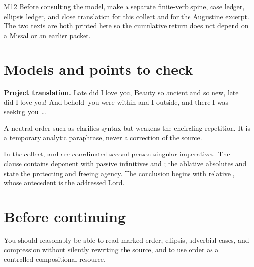 \begin{courseunit}{M12}
Before consulting the model, make a separate finite-verb spine, case ledger,
ellipsis ledger, and close translation for this collect and for the Augustine
excerpt.  The two texts are both printed here so the cumulative return does not
depend on a Missal or an earlier packet.

\ifsolutions
\section{Models and points to check}
\textbf{Project translation.} Late did I love you, Beauty so ancient and so
new, late did I love you! And behold, you were within and I outside, and there
I was seeking you~\ldots

A neutral order such as 
clarifies syntax but weakens the encircling repetition.  It is a temporary
analytic paraphrase, never a correction of the source.

In the collect,  and  are coordinated second-person
singular imperatives.  The -clause contains deponent
 with passive infinitives  and ;
the ablative absolutes  and  state the
protecting and freeing agency.  The conclusion begins with relative
, whose antecedent is the addressed Lord.
\else
\section{Before continuing}
You should reasonably be able to read marked order, ellipsis, adverbial cases,
and compression without silently rewriting the source, and to use order as a
controlled compositional resource.
\fi
\end{courseunit}

